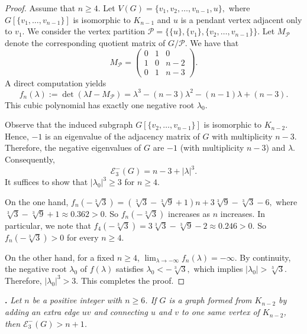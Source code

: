 \documentclass[a4paper,12pt]{article}
\theoremstyle{plain}
\begin{document}
\begin{proof}
Assume that $n\geq 4$. 
Let $V(G)=\{v_1,v_2,\ldots,v_{n-1},u\},$
where $G[\{v_1,\ldots,v_{n-1}\}]$ is isomorphic to $K_{n-1}$ and $u$ is a pendant vertex adjacent only to $v_1$.
We consider the vertex partition $\mathcal{P}=\{ \{u\},\{v_1\},\{v_2,\ldots,v_{n-1}\} \}.$
Let $M_{\mathcal{P}}$ denote the corresponding quotient matrix of $G/\mathcal{P}$. We have that 
$$
M_{\mathcal{P}}=
\begin{pmatrix}
0 & 1 & 0\\
1 & 0 & n-2\\
0 & 1 & n-3
\end{pmatrix}.
$$ A direct computation yields
$$f_n(\lambda):=\det(\lambda I-M_\mathcal{P})
=\lambda^3-(n-3)\lambda^2-(n-1)\lambda+(n-3).$$
This cubic polynomial has exactly one negative root $\lambda_0$. 

Observe that the induced subgraph $G[\{v_2,\ldots,v_{n-1}\}]$ is isomorphic to $K_{n-2}$. Hence, $-1$ is an eigenvalue of the adjacency matrix of $G$ with multiplicity $n-3$.
Therefore, the negative eigenvalues of $G$ are $-1$ (with multiplicity $n-3$) and $\lambda$.
Consequently, $$\mathcal{E}_3^{-}(G)=n-3+|\lambda|^3.$$
It suffices to show that $|\lambda_0|^3\geq 3$ for $n\geq 4$.

On the one hand, $f_n(-\sqrt[3]{3})= (\sqrt[3]{3} - \sqrt[3]{9} + 1)n + 3\sqrt[3]{9} - \sqrt[3]{3} - 6,$ where $\sqrt[3]{3} - \sqrt[3]{9} + 1\approx 0.362>0$. So $f_n(-\sqrt[3]{3})$ increases as $n$ increases. In particular, we note that $f_4(-\sqrt[3]{3})=3\sqrt[3]{3} - \sqrt[3]{9} - 2 \approx 0.246 > 0$. So $f_n(-\sqrt[3]{3})>0$ for every $n\geq 4$. 


On the other hand, for a fixed $n\geq 4$, $\lim_{\lambda \to -\infty} f_n(\lambda) = -\infty.$ By continuity, the negative root $\lambda_0$ of $f(\lambda)$ satisfies
$\lambda_0 < -\sqrt[3]{3},$
which implies $|\lambda_0| > \sqrt[3]{3}$. Therefore, $|\lambda_0|^3 > 3$. This completes the proof.
\end{proof}






\noindent
{\bf {}.}
\emph{Let $n$ be a positive integer with $n\geq 6$. If $G$ is a graph formed from $K_{n-2}$ by adding an extra edge $uv$ and connecting $u$ and $v$ to one same vertex of $K_{n-2}$, then $\mathcal{E}_3^{-}(G)>n+1$.}
\end{document}
